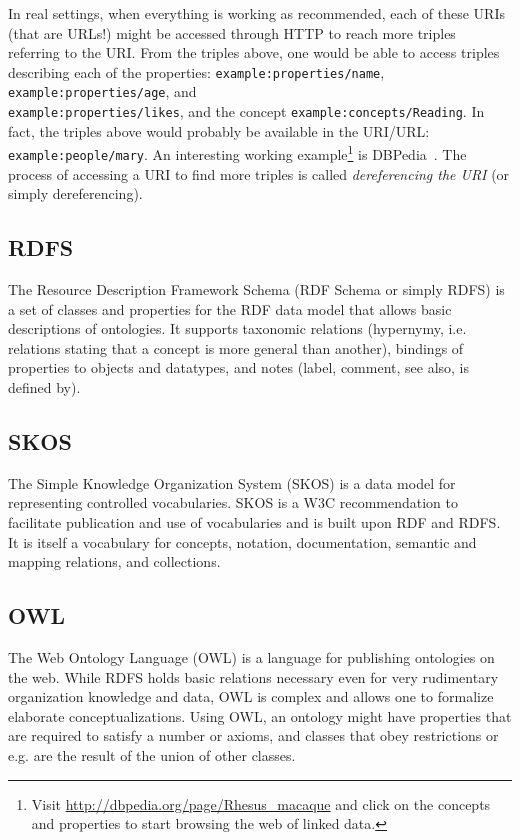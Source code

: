 \documentclass[12pt,fleqn]{article}
\begin{document}
In real settings, when everything is working as recommended,
each of these URIs (that are URLs!) might be accessed 
through HTTP to reach more triples referring to the URI.
From the triples above, one would be able to access triples
describing each of the properties: \texttt{example:properties/name}, \texttt{example:properties/age}, and\\
\texttt{example:properties/likes},
and the concept \texttt{example:concepts/Reading}.
In fact, the triples above would probably be available in the URI/URL:
\texttt{example:people/mary}.
An interesting working example\footnote{Visit \url{http://dbpedia.org/page/Rhesus_macaque}
and click on the concepts and properties to start browsing the web of linked data.} is DBPedia~\citep{dbpedia}.
The process of accessing a URI to find more triples is called \emph{dereferencing the URI} (or simply dereferencing).

\subsection{RDFS}
The Resource Description Framework Schema (RDF Schema or simply RDFS)
is a set of classes and properties for the RDF data model that allows
basic descriptions of ontologies.
It supports taxonomic relations (hypernymy, i.e. relations stating that a concept is more general than another),
bindings of properties to objects and datatypes, and notes (label, comment, see also, is defined by).

\subsection{SKOS}
The Simple Knowledge Organization System (SKOS)
is a data model for representing controlled vocabularies.
SKOS is a W3C recommendation to facilitate publication
and use of vocabularies and is built upon RDF and RDFS.
It is itself a vocabulary for concepts, notation, documentation,
semantic and mapping relations, and collections.

\subsection{OWL}
The Web Ontology Language (OWL) is a language for publishing ontologies on the web.
While RDFS holds basic relations necessary even for very rudimentary organization
knowledge and data, OWL is complex and allows one to formalize elaborate conceptualizations.
Using OWL, an ontology might have properties that are required to satisfy a number or axioms,
and classes that obey restrictions or e.g. are the result of the union of other classes.
\end{document}
